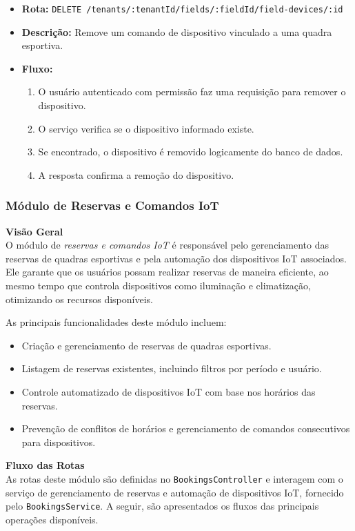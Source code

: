 \begin{itemize}
\item \textbf{Rota:} \texttt{DELETE /tenants/:tenantId/fields/:fieldId/field-devices/:id}
\item \textbf{Descrição:} Remove um comando de dispositivo vinculado a uma quadra esportiva.
\item \textbf{Fluxo:}
\begin{enumerate}
\item O usuário autenticado com permissão faz uma requisição para remover o dispositivo.
\item O serviço verifica se o dispositivo informado existe.
\item Se encontrado, o dispositivo é removido logicamente do banco de dados.
\item A resposta confirma a remoção do dispositivo.
\end{enumerate}
\end{itemize}

\subsubsection{Módulo de Reservas e Comandos IoT}\label{subsubsec:modulo_reservas}

\noindent\textbf{Visão Geral}\\
O módulo de \textit{reservas e comandos IoT} é responsável pelo gerenciamento das reservas de quadras esportivas e pela automação dos dispositivos IoT associados. Ele garante que os usuários possam realizar reservas de maneira eficiente, ao mesmo tempo que controla dispositivos como iluminação e climatização, otimizando os recursos disponíveis.

As principais funcionalidades deste módulo incluem:

\begin{itemize}
    \item Criação e gerenciamento de reservas de quadras esportivas.
    \item Listagem de reservas existentes, incluindo filtros por período e usuário.
    \item Controle automatizado de dispositivos IoT com base nos horários das reservas.
    \item Prevenção de conflitos de horários e gerenciamento de comandos consecutivos para dispositivos.
\end{itemize}

\noindent\textbf{Fluxo das Rotas}\\
As rotas deste módulo são definidas no \texttt{BookingsController} e interagem com o serviço de gerenciamento de reservas e automação de dispositivos IoT, fornecido pelo \texttt{BookingsService}. A seguir, são apresentados os fluxos das principais operações disponíveis.

